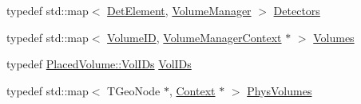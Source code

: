 \begin{DoxyCompactItemize}
\item 
typedef std::map$<$ \hyperlink{class_d_d4hep_1_1_geometry_1_1_det_element}{DetElement}, \hyperlink{class_d_d4hep_1_1_geometry_1_1_volume_manager}{VolumeManager} $>$ \hyperlink{class_d_d4hep_1_1_geometry_1_1_volume_manager_a89d31fb00522aa56dfa2708fedaf1e4f}{Detectors}
\item 
typedef std::map$<$ \hyperlink{class_d_d4hep_1_1_geometry_1_1_volume_manager_ab1f746b561c93be38bc7c6e66fc8ca8a}{VolumeID}, \hyperlink{class_d_d4hep_1_1_geometry_1_1_volume_manager_context}{VolumeManagerContext} $\ast$ $>$ \hyperlink{class_d_d4hep_1_1_geometry_1_1_volume_manager_a81625fd63b37636f0b4019b102aba787}{Volumes}
\item 
typedef \hyperlink{class_d_d4hep_1_1_geometry_1_1_placed_volume_extension_1_1_vol_i_ds}{PlacedVolume::VolIDs} \hyperlink{class_d_d4hep_1_1_geometry_1_1_volume_manager_a38763d6e830cf8e61ddd89d5416656eb}{VolIDs}
\item 
typedef std::map$<$ TGeoNode $\ast$, \hyperlink{class_d_d4hep_1_1_geometry_1_1_volume_manager_context}{Context} $\ast$ $>$ \hyperlink{class_d_d4hep_1_1_geometry_1_1_volume_manager_a6dd3900be98a6b11d4c8ab7f59632f36}{PhysVolumes}
\end{DoxyCompactItemize}
